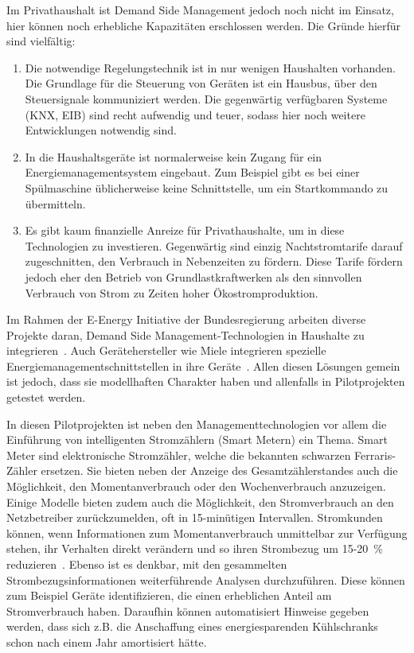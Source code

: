 \documentclass[logo]{fhgart}
\begin{document}
Im Privathaushalt ist Demand Side Management jedoch noch nicht im
Einsatz, hier können noch erhebliche Kapazitäten erschlossen werden. Die
Gründe hierfür sind vielfältig: 

\begin{enumerate}
  \item Die notwendige Regelungstechnik ist in nur wenigen Haushalten
    vorhanden. Die Grundlage für die Steuerung von Geräten ist ein
    Hausbus, über den Steuersignale kommuniziert werden. Die gegenwärtig
    verfügbaren Systeme (KNX, EIB) sind recht aufwendig und teuer,
    sodass hier noch weitere Entwicklungen notwendig sind.
  \item In die Haushaltsgeräte ist normalerweise kein Zugang für ein
    Energiemanagementsystem eingebaut. Zum Beispiel gibt es bei einer
    Spülmaschine üblicherweise keine Schnittstelle, um ein Startkommando
    zu übermitteln.
  \item Es gibt kaum finanzielle Anreize für Privathaushalte, um in
    diese Technologien zu investieren. Gegenwärtig sind einzig
    Nachtstromtarife darauf zugeschnitten, den Verbrauch in Nebenzeiten
    zu fördern. Diese Tarife fördern jedoch eher den Betrieb von
    Grundlastkraftwerken als den sinnvollen Verbrauch von Strom zu
    Zeiten hoher Ökostromproduktion.
\end{enumerate}


Im Rahmen der E-Energy Initiative der Bundesregierung arbeiten diverse
Projekte daran, Demand Side Management-Technologien in Haushalte zu
integrieren~\cite{web:e-energy}. Auch Gerätehersteller wie Miele
integrieren spezielle Energiemanagementschnittstellen in ihre
Geräte~\cite{miele10ifapresse}. Allen diesen Lösungen gemein ist jedoch,
dass sie modellhaften Charakter haben und allenfalls in Pilotprojekten
getestet werden.

In diesen Pilotprojekten ist neben den Managementtechnologien vor allem
die Einführung von intelligenten Stromzählern (Smart Metern) ein Thema.
Smart Meter sind elektronische Stromzähler, welche die bekannten
schwarzen Ferraris-Zähler ersetzen. Sie bieten neben der Anzeige des
Gesamtzählerstandes auch die Möglichkeit, den Momentanverbrauch oder den
Wochenverbrauch anzuzeigen. Einige Modelle bieten zudem auch die
Möglichkeit, den Stromverbrauch an den Netzbetreiber zurückzumelden, oft
in 15-minütigen Intervallen. Stromkunden können, wenn
Informationen zum Momentanverbrauch unmittelbar zur Verfügung stehen,
ihr Verhalten direkt verändern und so ihren Strombezug um 15-20~\%
reduzieren~\cite{geller2010smartgrid}. Ebenso ist es denkbar, mit den
gesammelten Strombezugsinformationen weiterführende Analysen
durchzuführen. Diese können zum Beispiel Geräte identifizieren, die
einen erheblichen Anteil am Stromverbrauch haben. Daraufhin können
automatisiert Hinweise gegeben werden, dass sich z.B. die Anschaffung
eines energiesparenden Kühlschranks schon nach einem Jahr amortisiert
hätte.
\end{document}
